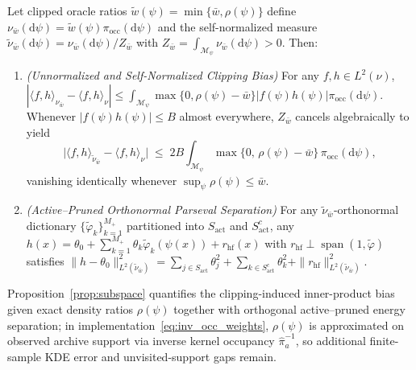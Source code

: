 \begin{proposition}\label{prop:subspace}
Let clipped oracle ratios $\tilde{w}(\psi) = \min\{\bar{w}, \rho(\psi)\}$ define $\nu_{\bar{w}}(\mathrm{d}\psi) = \tilde{w}(\psi)\pi_{\mathrm{occ}}(\mathrm{d}\psi)$ and the self-normalized measure $\tilde{\nu}_{\bar{w}}(\mathrm{d}\psi) = \nu_{\bar{w}}(\mathrm{d}\psi)/Z_{\bar{w}}$ with $Z_{\bar{w}} = \int_{\mathcal{M}_\psi} \nu_{\bar{w}}(\mathrm{d}\psi) > 0$. Then:
\begin{enumerate}
  \item \emph{(Unnormalized and Self-Normalized Clipping Bias)} For any $f, h \in L^2(\nu)$, $|\langle f, h \rangle_{\nu_{\bar{w}}} - \langle f, h \rangle_\nu| \le \int_{\mathcal{M}_\psi} \max\{0, \rho(\psi) - \bar{w}\}|f(\psi)h(\psi)|\pi_{\mathrm{occ}}(\mathrm{d}\psi)$. Whenever $|f(\psi)h(\psi)| \le B$ almost everywhere, $Z_{\bar{w}}$ cancels algebraically to yield
  \begin{equation}\label{eq:norm_clip_bias}
    \big|\langle f, h \rangle_{\tilde{\nu}_{\bar{w}}} - \langle f, h \rangle_\nu\big| \;\le\; 2 B \int_{\mathcal{M}_\psi} \max\{0,\, \rho(\psi) - \bar{w}\}\,\pi_{\mathrm{occ}}(\mathrm{d}\psi),
  \end{equation}
  vanishing identically whenever $\sup_\psi \rho(\psi) \le \bar{w}$.
  \item \emph{(Active--Pruned Orthonormal Parseval Separation)} For any $\tilde{\nu}_{\bar{w}}$-orthonormal dictionary $\{\tilde{\varphi}_k\}_{k=1}^{M_+}$ partitioned into $S_{\mathrm{act}}$ and $S_{\mathrm{act}}^c$, any $h(x) = \theta_0 + \sum_{k=1}^{M_+} \theta_k \tilde{\varphi}_k(\psi(x)) + r_{\mathrm{hf}}(x)$ with $r_{\mathrm{hf}} \perp \operatorname{span}(1, \tilde{\varphi})$ satisfies $\|h - \theta_0\|_{L^2(\tilde{\nu}_{\bar{w}})}^2 = \sum_{j \in S_{\mathrm{act}}} \theta_j^2 + \sum_{k \in S_{\mathrm{act}}^c} \theta_k^2 + \|r_{\mathrm{hf}}\|_{L^2(\tilde{\nu}_{\bar{w}})}^2$.
\end{enumerate}
\end{proposition}

Proposition~\ref{prop:subspace} quantifies the clipping-induced inner-product bias given exact density ratios $\rho(\psi)$ together with orthogonal active--pruned energy separation; in implementation~\eqref{eq:inv_occ_weights}, $\rho(\psi)$ is approximated on observed archive support via inverse kernel occupancy $\hat{\pi}_a^{-1}$, so additional finite-sample KDE error and unvisited-support gaps remain.

